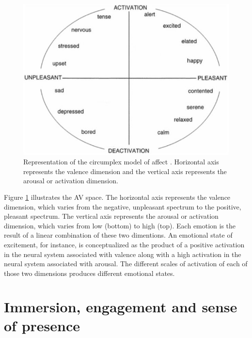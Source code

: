 \begin{figure}[h!]
    \centering
    \includegraphics[scale=0.5]{Content/figures/russell-av.png}
    \caption{Representation of the circumplex model of affect \parencite{posner2005circumplex}. Horizontal axis represents the valence dimension and the vertical axis represents the arousal or activation dimension.}
    \label{fig:av-model}
\end{figure}

Figure \ref{fig:av-model} illustrates the AV space. The horizontal axis represents the valence dimension, which varies from the negative, unpleasant spectrum to the positive, pleasant spectrum. The vertical axis represents the arousal or activation dimension, which varies from low (bottom) to high (top). Each emotion is the result of a linear combination of these two dimentions. An emotional state of excitement, for instance, is conceptualized as the product of a positive activation in the neural system associated with valence along with a high activation in the neural system associated with arousal. The different scales of activation of each of those two dimensions produces different emotional states.

\section{Immersion, engagement and sense of presence}

